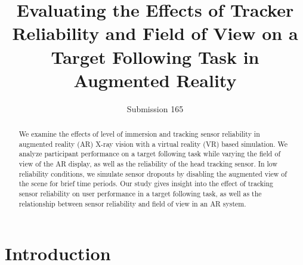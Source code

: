 \documentclass{acmsiggraph}                     %
\title{Evaluating the Effects of Tracker Reliability and Field of View on a Target Following Task in Augmented Reality}
\author{
Submission 165
}
\begin{document}


\maketitle


\begin{abstract}

We examine the effects of level of immersion and tracking sensor reliability in augmented reality (AR) X-ray vision with a virtual reality (VR) based simulation.  We analyze participant performance on a target following task while varying the field of view of the AR display, as well as the reliability of the head tracking sensor.  In low reliability conditions, we simulate sensor dropouts by disabling the augmented view of the scene for brief time periods.  Our study gives insight into the effect of tracking sensor reliability on user performance in a target following task, as well as the relationship between sensor reliability and field of view in an AR system.

\end{abstract}


\begin{CRcatlist}
\end{CRcatlist}

\keywordlist

\section{Introduction}

\end{document}
